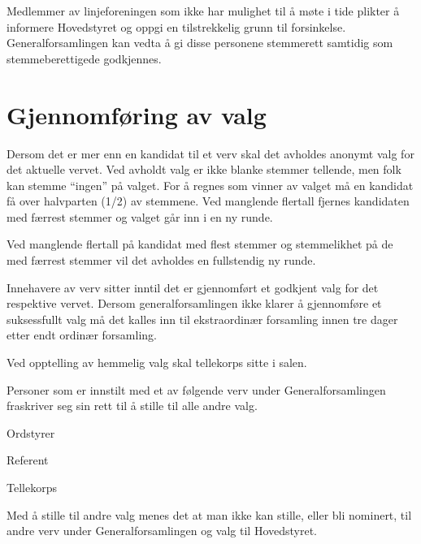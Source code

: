 Medlemmer av linjeforeningen som ikke har mulighet til å møte i tide plikter å informere Hovedstyret og oppgi en tilstrekkelig grunn til forsinkelse. Generalforsamlingen kan vedta å gi disse personene stemmerett samtidig som stemmeberettigede godkjennes.

\section{Gjennomføring av valg}{
Dersom det er mer enn en kandidat til et verv skal det avholdes anonymt valg for det aktuelle vervet. Ved
avholdt valg er ikke blanke stemmer tellende, men folk kan stemme ``ingen'' på valget. For å regnes som vinner av valget må en kandidat få over halvparten (1/2) av stemmene. Ved manglende flertall fjernes kandidaten med færrest stemmer \linebreak og valget går inn i en ny runde. \newline

Ved manglende flertall på kandidat med flest stemmer og stemmelikhet på de med færrest stemmer vil det
avholdes en fullstendig ny runde. \newline

Innehavere av verv sitter inntil det er gjennomført et godkjent valg for det respektive vervet. Dersom
generalforsamlingen ikke klarer å gjennomføre et suksessfullt valg må det kalles inn til ekstraordinær
forsamling innen tre dager etter endt ordinær forsamling.

Ved opptelling av hemmelig valg skal tellekorps sitte i salen.

	 {
	Personer som er innstilt med et av følgende verv under Generalforsamlingen fraskriver seg sin rett til å stille til alle andre valg.
	\begin{liste}
		\item Ordstyrer
		\item Referent
		\item Tellekorps
	\end{liste}
	Med å stille til andre valg menes det at man ikke kan stille, eller
	bli nominert, til andre verv under Generalforsamlingen og valg til
	Hovedstyret.
	}
}
